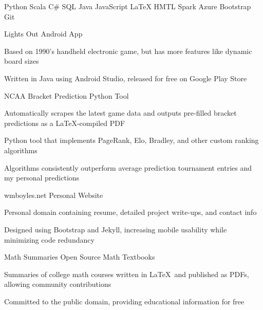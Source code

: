 \documentclass[a4paper]{awesome-cv}
\begin{document}
	
	\begin{cvparagraph}
	
		
		{ Python } \textbar 
		{ Scala } \textbar
		{ C\# } \textbar 
		{ SQL } \textbar
		{ Java } \textbar
		{ JavaScript } \textbar 
		{ \LaTeX } \textbar
		{ HMTL } \newline\newline
		{ Spark } \textbar
		{ Azure } \textbar
		{ Bootstrap } \textbar
		{ Git }
	\end{cvparagraph}
	
	\begin{cventries}
		\cvprojectentry
		{Lights Out} %
		{Android App} %
		{
			\begin{cvitems} %
				\item {Based on 1990’s handheld electronic game, but has more features like dynamic board sizes}
				\item {Written in Java using Android Studio, released for free on Google Play Store}
			\end{cvitems}
		}
	
		\cvprojectentry
		{NCAA Bracket Prediction} %
		{Python Tool} %
		{
			\begin{cvitems} %
				\item {Automatically scrapes the latest game data and outputs pre-filled bracket predictions as a \LaTeX-compiled PDF}
				\item {Python tool that implements PageRank, Elo, Bradley, and other custom ranking algorithms}
				\item {Algorithms consistently outperform average prediction tournament entries and my personal predictions}
			\end{cvitems}
		}
	
		\cvprojectentry
		{wmboyles.net} %
		{Personal Website} %
		{
			\begin{cvitems} %
				\item {Personal domain containing resume, detailed project write-ups, and contact info}
				\item {Designed using Bootstrap and Jekyll, increasing mobile usability while minimizing code redundancy}
			\end{cvitems}
		}
	
		\cvprojectentry
		{Math Summaries} %
		{Open Source Math Textbooks} %
		{
			\begin{cvitems} %
				\item {Summaries of college math courses written in \LaTeX ~and published as PDFs, allowing community contributions}
				\item {Committed to the public domain, providing educational information for free}
			\end{cvitems}
		}
	\end{cventries}
\end{document}
